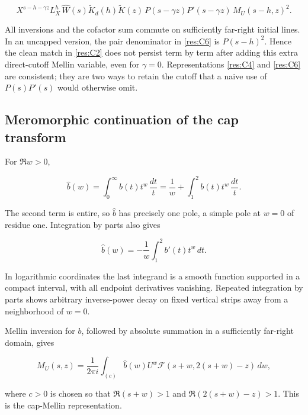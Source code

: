 \documentclass[11pt]{article}
\numberwithin{equation}{section}
\newcommand{\F}{\mathcal F}
\begin{document}
\begin{equation}\label{res:C6}
X^{s-h-\gamma z}L_X^h\,
 \widehat W(s)\widetilde K_d(h)\widetilde K(z)\,
 P(s-\gamma z)P'(s-\gamma z)\,
 M_U(s-h,z)^2.
\end{equation}

All inversions and the cofactor sum commute on sufficiently far-right
initial lines. In an uncapped version, the pair denominator in
\eqref{res:C6} is \(P(s-h)^2\). Hence the clean match in \eqref{res:C2}
does not persist term by term after adding this extra direct-cutoff
Mellin variable, even for \(\gamma=0\). Representations \eqref{res:C4}
and \eqref{res:C6} are consistent; they are two ways to retain the
cutoff that a naive use of \(P(s)P'(s)\) would otherwise omit.

\subsection{Meromorphic continuation of the cap
transform}\label{meromorphic-continuation-of-the-cap-transform}

For \(\Re w>0\),

\begin{equation}\label{res:C7}
\widehat b(w)=\int_0^\infty b(t)t^w\,\frac{dt}{t}
 =\frac1w+\int_1^2 b(t)t^w\,\frac{dt}{t}.
\end{equation}

The second term is entire, so \(\widehat b\) has precisely one pole, a
simple pole at \(w=0\) of residue one. Integration by parts also gives

\begin{equation}\label{res:C8}
\widehat b(w)=-\frac1w\int_1^2 b'(t)t^w\,dt.
\end{equation}

In logarithmic coordinates the last integrand is a smooth function
supported in a compact interval, with all endpoint derivatives
vanishing. Repeated integration by parts shows arbitrary inverse-power
decay on fixed vertical strips away from a neighborhood of \(w=0\).

Mellin inversion for \(b\), followed by absolute summation in a
sufficiently far-right domain, gives

\begin{equation}\label{res:C9}
M_U(s,z)=\frac1{2\pi i}\int_{(c)}
 \widehat b(w)U^w\F(s+w,2(s+w)-z)\,dw,
\end{equation}

where \(c>0\) is chosen so that \(\Re(s+w)>1\) and \(\Re(2(s+w)-z)>1\).
This is the cap-Mellin representation.
\end{document}

